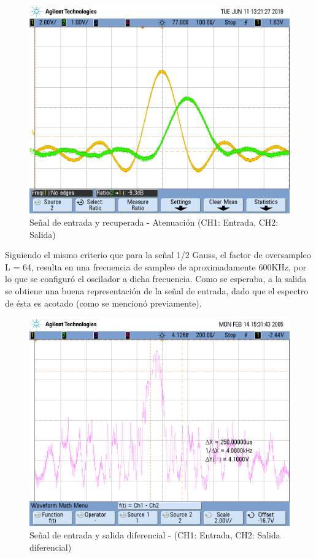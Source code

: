 \documentclass[assd_tp3_main.tex]{subfiles}
\begin{document}
\begin{figure}[!ht]
\begin{centering}
\includegraphics[scale=0.25]{../EJ4/Mediciones/Sinc/s3_1a.png}
\par\end{centering}
\caption{Señal de entrada y recuperada - Atenuación (CH1: Entrada, CH2: Salida)}
\end{figure}

Siguiendo el mismo criterio que para la señal 1/2 Gauss, el factor de oversampleo L = 64, resulta en una frecuencia de sampleo de aproximadamente 600KHz, por lo que se configuró el oscilador a dicha frecuencia. Como se esperaba, a la salida se obtiene una buena representación de la señal de entrada, dado que el espectro de ésta es acotado (como se mencionó previamente).

\newpage

\begin{figure}[!ht]
\begin{centering}
\includegraphics[scale=0.25]{../EJ4/Mediciones/Sinc/dif_sinc.png}
\par\end{centering}
\caption{Señal de entrada y salida diferencial - (CH1: Entrada, CH2: Salida diferencial)}
\end{figure}
\end{document}
